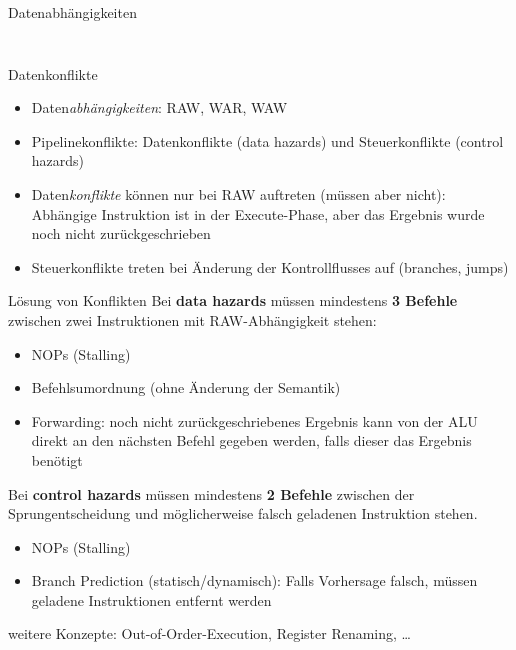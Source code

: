 \documentclass[
  german,            %
  aspectratio=169,    %
]{tumbeamer}
\begin{document}
\begin{frame}[c, fragile]{Datenabhängigkeiten}{}
\begin{columns}[c]
\begin{column}{0.3\textwidth}
{{\begin{enumerate}[i.]
			\end{enumerate}
			}
			\vspace{\baselineskip}
			}
		\end{column}
	\end{columns}
\end{frame}

\begin{frame}[c, fragile]{Datenkonflikte}{}
	\begin{itemize}
		\item Daten\textit{abhängigkeiten}: RAW, WAR, WAW
		\item Pipelinekonflikte: Datenkonflikte (data hazards) und Steuerkonflikte (control hazards)
		\item Daten\textit{konflikte} können nur bei RAW auftreten (müssen aber nicht): Abhängige Instruktion ist in der Execute-Phase, aber das Ergebnis wurde noch nicht zurückgeschrieben
		\item Steuerkonflikte treten bei Änderung der Kontrollflusses auf (branches, jumps)
	\end{itemize}
\end{frame}

\begin{frame}[c, fragile]{Lösung von Konflikten}
	Bei \textbf{data hazards} müssen mindestens \textbf{3 Befehle} zwischen zwei Instruktionen mit RAW-Abhängigkeit stehen:
	\begin{itemize}
		\item NOPs (Stalling)
		\item Befehlsumordnung (ohne Änderung der Semantik)
		\item Forwarding: noch nicht zurückgeschriebenes Ergebnis kann von der ALU direkt an den nächsten Befehl gegeben werden, falls dieser das Ergebnis benötigt
	\end{itemize}
	\vspace{0.5cm}
	Bei \textbf{control hazards} müssen mindestens \textbf{2 Befehle} zwischen der Sprungentscheidung und möglicherweise falsch geladenen Instruktion stehen.
	\begin{itemize}
		\item NOPs (Stalling)
		\item Branch Prediction (statisch/dynamisch): Falls Vorhersage falsch, müssen geladene Instruktionen entfernt werden
	\end{itemize}
	\vspace{0.5cm}
	weitere Konzepte: Out-of-Order-Execution, Register Renaming, \ldots
\end{frame}
\end{document}
